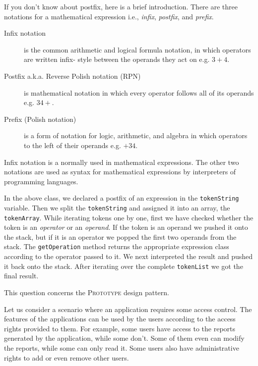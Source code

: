 \documentclass[12pt,a4paper]{exam}
\begin{document}
\begin{questions}
If you don't know about postfix, here is a brief introduction. There are three notations for 
a mathematical expression i.e., \emph{infix}, \emph{postfix}, and \emph{prefix}.
\begin{description}
\item[Infix notation] is the common arithmetic and logical formula notation, in which operators are written infix-
style between the operands they act on e.g. $3 + 4$.
\item[Postfix a.k.a. Reverse Polish notation (RPN)] is mathematical notation in which every operator follows all 
of its operands e.g. $3 4 +$.
\item[Prefix (Polish notation)] is a form of notation for logic, arithmetic, and algebra in which operators to the 
left of their operands e.g. $+ 3 4$.
\end{description}
Infix notation is a normally used in mathematical expressions. The other two notations are used as syntax for 
mathematical expressions by interpreters of programming languages.

In the above class, we declared a postfix of an expression in the \texttt{tokenString} variable. 
Then we split the \texttt{tokenString} and assigned it into an array, the \texttt
{tokenArray}. While iterating tokens one by one, first we have checked whether the token 
is an \emph{operator} or an \emph{operand}. If the token is an operand we pushed it onto the stack, but if it is 
an operator we popped the first two operands from the stack. 
The \texttt{getOperation} method returns the appropriate expression class according to the operator 
passed to it.
We next interpreted the result and pushed it back onto the stack. After iterating over the complete 
\texttt{tokenList} we got the final result.

\begin{solution}
	
\end{solution}

\question
This question concerns the \textsc{Prototype} design pattern.

Let us consider a scenario where an application requires some access control. The features of the applications 
can be used by the users according to the access rights provided to them. For example, some users have access to 
the reports generated by the application, while some don't. Some of them even can modify the reports, while some 
can only read it. Some users also have administrative rights to add or even remove other users.


\end{questions}
\end{document}
